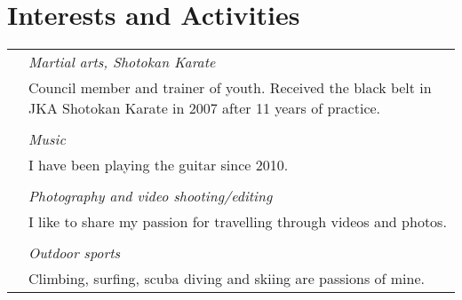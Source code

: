 \documentclass[a4paper,10pt]{article}
\begin{document}
\section{Interests and Activities}
\begin{tabular}{rl}
&\emph{Martial arts, Shotokan Karate}\\
&\footnotesize{Council member and trainer of youth. Received the black belt in JKA Shotokan Karate in 2007 after 11 years of practice.}\\\multicolumn{2}{c}{} \\
 
&\emph{Music}\\
&\footnotesize{I have been playing the guitar since 2010.}\\\multicolumn{2}{c}{} \\
 
&\emph{Photography and video shooting/editing}\\
&\footnotesize{I like to share my passion for travelling through videos and photos.}\\ \multicolumn{2}{c}{} \\
 
 
&\emph{Outdoor sports}\\
&\footnotesize{Climbing, surfing, scuba diving and skiing are passions of mine.}\\
 
\end{tabular}
 
 
\end{document}
